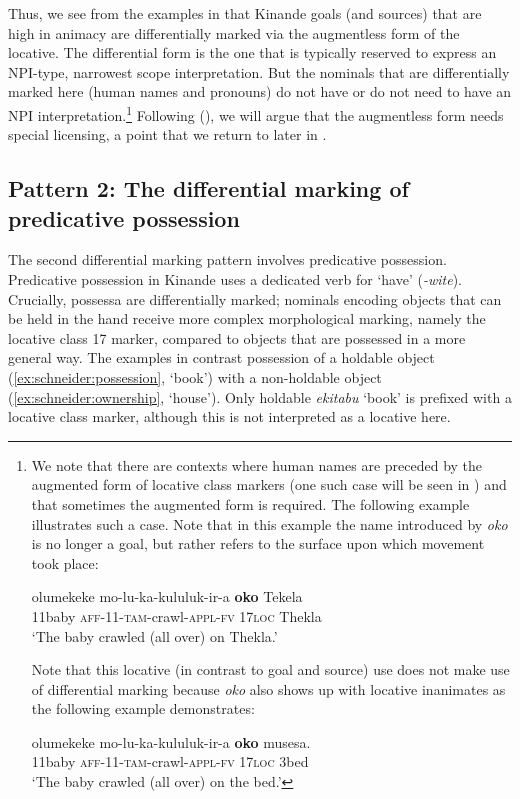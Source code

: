 \documentclass[output=paper]{langscibook}
\begin{document}
Thus, we see from the examples in  that Kinande goals (and sources) that are high in animacy are differentially marked via the augmentless form of the locative. The differential form is the one that is typically reserved to express an NPI-type, narrowest scope interpretation. But the nominals that are differentially marked here (human names and pronouns) do not have or do not need to have an NPI interpretation.\footnote{We note that there are contexts where human names are preceded by the augmented form of locative class markers (one such case will be seen in ) and that sometimes the augmented form is required. The following example illustrates such a case. Note that in this example the name introduced by \textit{oko} is no longer a goal, but rather refers to the surface upon which movement took place: 

\ea \label{ex:schneider:surfaceanimate}
\gll olumekeke 	mo-lu-ka-kululuk-ir-a 		\textbf{oko} 	Tekela\\
11baby  \textsc{aff-11-tam-}crawl-\textsc{appl-fv} 	\textsc{17loc} 	Thekla\\
\glt  `The baby crawled (all over) on Thekla.'
\z 

Note that this locative (in contrast to goal and source) use does not make use of differential marking because \textit{oko} also shows up with locative inanimates as the following example demonstrates:

\ea \label{ex:schneider:surfaceinanimate}
\gll olumekeke 	mo-lu-ka-kululuk-ir-a       \textbf{oko}  	musesa.\\
11baby \textsc{aff-11-tam-}crawl-\textsc{appl-fv}  \textsc{17loc} 3bed\\
\glt  `The baby crawled (all over) on the bed.'
\z} Following \citeauthor{Halpert2015} (\citeyear{Halpert2015}), we will argue that the augmentless form needs special licensing, a point that we return to later in .

\subsection{Pattern 2: The differential marking of predicative possession}\label{sec:schneider:subsection2.2Differentialmarkingpredicativepossession}

The second differential marking pattern involves predicative possession. Predicative possession in Kinande uses a dedicated verb for ‘have’ (\textit{-wite}). Crucially, possessa are differentially marked; nominals encoding objects that can be held in the hand receive more complex morphological marking, namely the locative class 17 marker, compared to objects that are possessed in a more general way. The examples in  contrast possession of a holdable object (\ref{ex:schneider:possession}, ‘book’) with a non-holdable object (\ref{ex:schneider:ownership}, ‘house’). Only holdable \textit{ekitabu} ‘book’ is prefixed with a locative class marker, although this is not interpreted as a locative here. 
\end{document}
